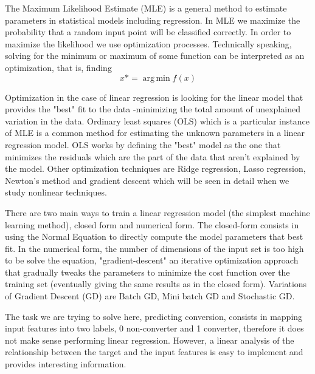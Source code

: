 \documentclass[11pt]{article}
\theoremstyle{definition}
\theoremstyle{remark}
\DeclareMathOperator*{\argmin}{arg\,min}
\begin{document}
The Maximum Likelihood Estimate (MLE) is a general method to estimate parameters in statistical models including regression. In MLE we maximize the probability that a random input point will be classified correctly. In order to maximize the likelihood we use optimization processes. 
Technically speaking, solving for the minimum or maximum of some function can be interpreted as an optimization, that is, finding 
\begin{equation*}
x* = \argmin f(x)
\end{equation*}
 
Optimization in the case of linear regression is looking for the linear model that provides the "best" fit to the data -minimizing the total amount of unexplained variation in the data.
Ordinary least squares (OLS) which is a particular instance of MLE is a common method for estimating the unknown parameters in a linear regression model. OLS works by defining the "best" model as the one that minimizes the residuals which are the part of the data that aren't explained by the model. Other optimization techniques are Ridge regression, Lasso regression, Newton's method and gradient descent which will be seen in detail when we study nonlinear techniques.

There are two main ways to train a linear regression model (the simplest machine learning method), closed form and numerical form. The closed-form consists in using the Normal Equation to directly compute the model parameters that best fit. In the numerical form, the number of dimensions of the input set is too high to be solve the equation, "gradient-descent" an iterative optimization approach that gradually tweaks the parameters to minimize the cost function over the training set (eventually giving the same results as in the closed form). Variations of Gradient Descent (GD) are Batch GD, Mini batch GD and Stochastic GD.

The task we are trying to solve here, predicting conversion, consists in mapping input features into two labels, 0 non-converter and 1 converter, therefore it does not make sense performing linear regression. However, a linear analysis of the relationship between the target and the input features is easy to implement and provides interesting information. 
\end{document}

